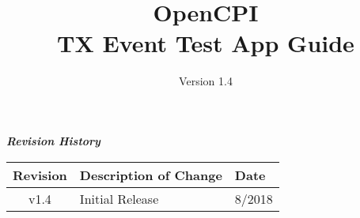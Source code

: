 \iffalse
This file is protected by Copyright. Please refer to the COPYRIGHT file
distributed with this source distribution.

This file is part of OpenCPI <http://www.opencpi.org>

OpenCPI is free software: you can redistribute it and/or modify it under the
terms of the GNU Lesser General Public License as published by the Free Software
Foundation, either version 3 of the License, or (at your option) any later
version.

OpenCPI is distributed in the hope that it will be useful, but WITHOUT ANY
WARRANTY; without even the implied warranty of MERCHANTABILITY or FITNESS FOR A
PARTICULAR PURPOSE. See the GNU Lesser General Public License for more details.

You should have received a copy of the GNU Lesser General Public License along
with this program. If not, see <http://www.gnu.org/licenses/>.
\fi

\def\docTitle{OpenCPI\\ TX Event Test App Guide}
\def\docVersion{1.4}

\date{Version \docVersion} %
\title{\docTitle}
\usepackage{graphicx}
\graphicspath{ {figures/} }
\usepackage{textcomp}
\usepackage{listings}


\maketitle
\newpage
	\begin{center}
	\textit{\textbf{Revision History}}
		\begin{table}[H]
		\label{table:revisions} %
			\begin{tabularx}{\textwidth}{|c|X|l|}
			\hline
			\rowcolor{blue}
			\textbf{Revision} & \textbf{Description of Change} & \textbf{Date} \\
		    \hline
		    v1.4 & Initial Release & 8/2018 \\
			\hline
			\end{tabularx}
		\end{table}
	\end{center}

